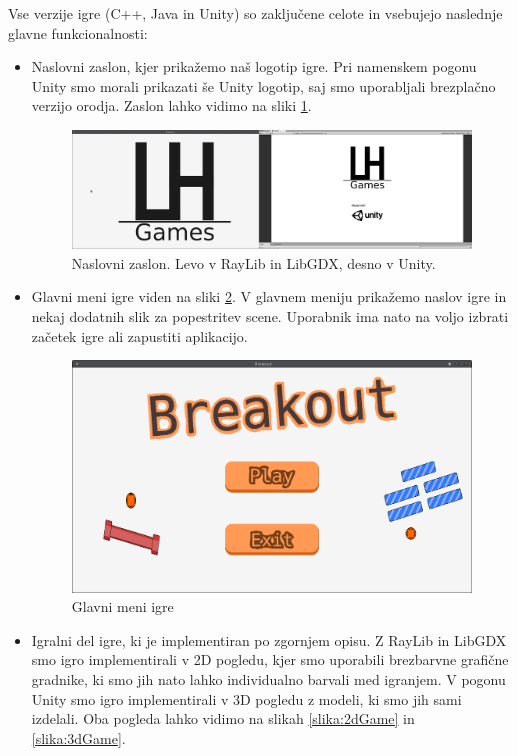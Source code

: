 \documentclass[12pt,a4paper,twoside]{book}
\begin{document}
Vse verzije igre (C++, Java in Unity) so zaključene celote in vsebujejo naslednje glavne funkcionalnosti:
\begin{itemize}
\item Naslovni zaslon, kjer prikažemo naš logotip igre. Pri namenskem pogonu Unity smo morali prikazati še Unity logotip, saj smo uporabljali brezplačno verzijo orodja. Zaslon lahko vidimo na sliki \ref{slika:naslovniZaslon}.
\begin{figure}[h]
	\centering
	\includegraphics[width=14cm]{titleScreen}
	\caption{Naslovni zaslon. Levo v RayLib in LibGDX, desno v Unity.}
	\label{slika:naslovniZaslon}
\end{figure}
\item Glavni meni igre viden na sliki \ref{slika:mainMenu}. V glavnem meniju prikažemo naslov igre in nekaj dodatnih slik za popestritev scene. Uporabnik ima nato na voljo izbrati začetek igre ali zapustiti aplikacijo.
\begin{figure}[h]
	\centering
	\includegraphics[width=14cm]{mainMenu}
	\caption{Glavni meni igre}
	\label{slika:mainMenu}
\end{figure}
\item Igralni del igre, ki je implementiran po zgornjem opisu. Z RayLib in LibGDX smo igro implementirali v 2D pogledu, kjer smo uporabili brezbarvne grafične gradnike, ki smo jih nato lahko individualno barvali med igranjem. V pogonu Unity  smo igro implementirali v 3D pogledu z modeli, ki smo jih sami izdelali. Oba pogleda lahko vidimo na slikah \ref{slika:2dGame} in \ref{slika:3dGame}.

\end{itemize}
\end{document}
